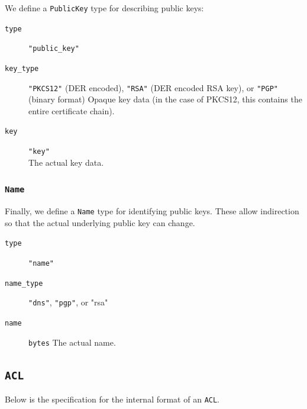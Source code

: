 \documentclass[pdftex,12pt,a4papaer,twoside,notitlepage]{report}
\begin{document}
We define a \texttt{PublicKey} type for describing public keys:

\begin{leftbar}
\begin{description}
\item[\texttt{type}] \verb="public_key"=
\item[\texttt{key\_type}] \verb="PKCS12"= (DER encoded), \verb="RSA"= (DER
  encoded RSA key), or \verb="PGP"= (binary format) Opaque key data (in the case
  of PKCS12, this contains the entire certificate chain).
\item[\texttt{key}] \verb="key"= \\
  The actual key data.
\end{description}
\end{leftbar}

\subsubsection{\texttt{Name}}

Finally, we define a \texttt{Name} type for identifying public keys. These allow
indirection so that the actual underlying public key can change.

\begin{leftbar}
\begin{description}
  \item[\texttt{type}] \verb="name"=
  \item[\texttt{name\_type}] \verb="dns"=, \verb="pgp"=, or "rsa"
  \item[\texttt{name}] \texttt{bytes}
    The actual name.
\end{description}
\end{leftbar}

\subsection{\texttt{ACL}}

Below is the specification for the internal format of an \texttt{ACL}.
\end{document}

